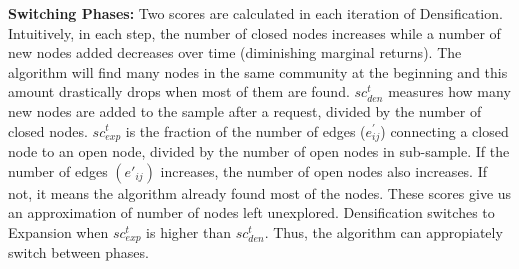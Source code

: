 \textbf{Switching Phases:}
Two scores are calculated in each iteration of Densification. Intuitively, in each step, the number of closed nodes increases while a number of new nodes added decreases over time (diminishing marginal returns). The algorithm will find many nodes in the same community at the beginning and this amount drastically drops when most of them are found. $sc^{t}_{den}$ measures how many new nodes are added to the sample after a request, divided by the number of closed nodes.  $sc^{t}_{exp}$ is the fraction of the number of edges ($e_{ij}^{'}$) connecting a closed node to an open node, divided by the number of open nodes in sub-sample.  If the number of edges $(e'_{ij})$ increases, the number of open nodes also increases. If not, it means the algorithm already found most of the nodes.  These scores give us an approximation of number of nodes left unexplored. Densification switches to Expansion when $sc^{t}_{exp}$ is higher than $sc^t_{den}$. Thus, the algorithm can appropiately switch between phases. 

